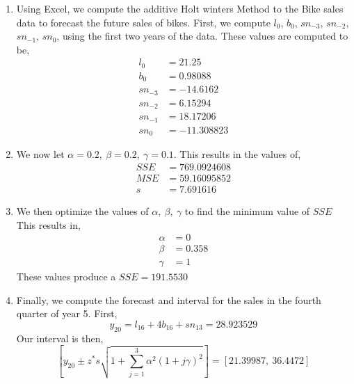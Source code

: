\documentclass[letterpaper,10pt]{article}
\begin{document}
\begin{enumerate}
\item Using Excel, we compute the additive Holt winters Method to the Bike sales data to forecast the future sales of bikes. First, we compute $l_0$, $b_0$, $sn_{-3}$, $sn_{-2}$, $sn_{-1}$, $sn_0$, using the first two years of the data. These values are computed to be,
\begin{align*}
l_0 &= 21.25\\
b_0 &= 0.98088\\
sn_{-3} &= -14.6162\\
sn_{-2} &= 6.15294\\
sn_{-1} &= 18.17206\\
sn_0 &= -11.308823
\end{align*}
\item We now let $\alpha=0.2,\ \beta=0.2,\ \gamma=0.1$. This results in the values of,
\begin{align*}
SSE &= 769.0924608\\
MSE &= 59.16095852\\
s &= 7.691616
\end{align*}
\item We then optimize the values of $\alpha,\ \beta,\ \gamma$ to find the minimum value of $SSE$ This results in,
\begin{align*}
\alpha &= 0\\
\beta &= 0.358\\
\gamma &= 1
\end{align*}
These values produce a $SSE=191.5530$
\item Finally, we compute the forecast and interval for the sales in the fourth quarter of year 5. First,
\[y_{20}=l_{16}+4b_{16}+sn_{13}=28.923529\]
Our interval is then,
\[\left[y_{20}\pm z^*s\sqrt{1+\sum_{j=1}^3\alpha^2(1+j\gamma)^2}\right]=[21.39987,\ 36.4472]\]
\end{enumerate}
\end{document}
